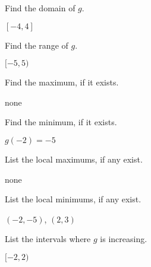 \documentclass{ximera}
\begin{document}
\begin{question}\label{usesecondfuncgraphfirst}
Find the domain of $g$.
\begin{solution}
$[-4,4]$
\end{solution}

\end{question}

\begin{question}
Find the range of $g$.

\begin{solution}
$[-5,5)$
\end{solution}

\end{question}

\begin{question}
Find the maximum, if it exists.
\begin{solution}
none

\end{solution}

\end{question}

\begin{question}
Find the minimum, if it exists. 

\begin{solution}
$g(-2) = -5$
\end{solution}

\end{question}

\begin{question}
List the local maximums, if any exist.
\begin{solution}
none
\end{solution}

\end{question}

\begin{question}
List the local minimums, if any exist.

\begin{solution}
$(-2,-5)$, $(2,3)$

\end{solution}

\end{question}

\begin{question}
List the intervals where $g$ is increasing.
\begin{solution}
$[-2,2)$
\end{solution}

\end{question}
\end{document}
